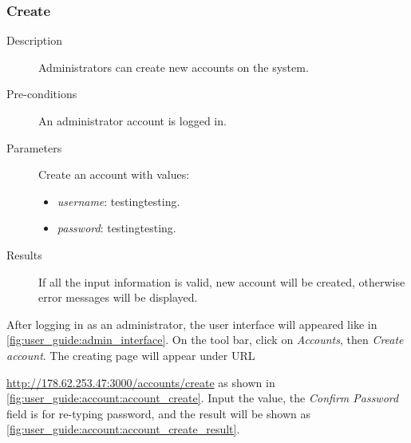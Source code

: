 \subsubsection{Create}
\label{ch:result:user_guide:account:create}

\begin{description}
\item[Description] Administrators can create new accounts on the system.
\item[Pre-conditions] An administrator account is logged in.
\item[Parameters] Create an account with values:
\begin{itemize}
\item \emph{username}: testingtesting.
\item \emph{password}: testingtesting.
\end{itemize}
\item[Results] If all the input information is valid, new account will be created, otherwise error messages will be displayed.
\end{description}

After logging in as an administrator, the user interface will appeared like in \autoref{fig:user_guide:admin_interface}.
On the tool bar, click on \emph{Accounts}, then \emph{Create account}.
The creating page will appear under URL

\noindent\href{http://178.62.253.47:3000/accounts/create}{http://178.62.253.47:3000/accounts/create} as shown in \autoref{fig:user_guide:account:account_create}.
Input the value, the \emph{Confirm Password} field is for re-typing password, and the result will be shown as \autoref{fig:user_guide:account:account_create_result}.

